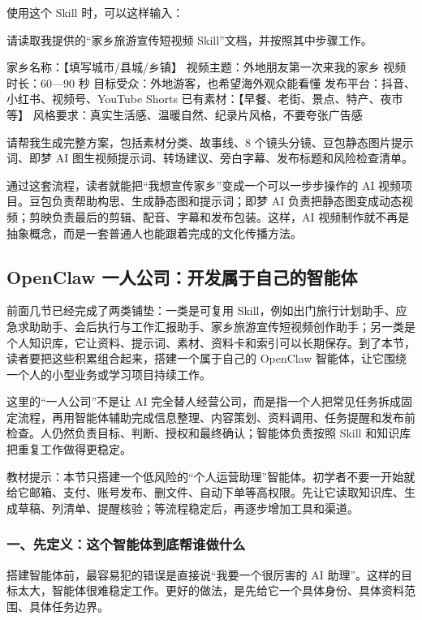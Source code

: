 使用这个 Skill 时，可以这样输入：

\begin{tcolorbox}[promptbox]
请读取我提供的“家乡旅游宣传短视频 Skill”文档，并按照其中步骤工作。

家乡名称：【填写城市/县城/乡镇】
视频主题：外地朋友第一次来我的家乡
视频时长：60—90 秒
目标受众：外地游客，也希望海外观众能看懂
发布平台：抖音、小红书、视频号、YouTube Shorts
已有素材：【早餐、老街、景点、特产、夜市等】
风格要求：真实生活感、温暖自然、纪录片风格，不要夸张广告感

请帮我生成完整方案，包括素材分类、故事线、8 个镜头分镜、豆包静态图片提示词、即梦 AI 图生视频提示词、转场建议、旁白字幕、发布标题和风险检查清单。
\end{tcolorbox}

通过这套流程，读者就能把“我想宣传家乡”变成一个可以一步步操作的 AI 视频项目。豆包负责帮助构思、生成静态图和提示词；即梦 AI 负责把静态图变成动态视频；剪映负责最后的剪辑、配音、字幕和发布包装。这样，AI 视频制作就不再是抽象概念，而是一套普通人也能跟着完成的文化传播方法。


\subsection{OpenClaw 一人公司：开发属于自己的智能体}

前面几节已经完成了两类铺垫：一类是可复用 Skill，例如出门旅行计划助手、应急求助助手、会后执行与工作汇报助手、家乡旅游宣传短视频创作助手；另一类是个人知识库，它让资料、提示词、素材、资料卡和索引可以长期保存。到了本节，读者要把这些积累组合起来，搭建一个属于自己的 OpenClaw 智能体，让它围绕一个人的小型业务或学习项目持续工作。

这里的“一人公司”不是让 AI 完全替人经营公司，而是指一个人把常见任务拆成固定流程，再用智能体辅助完成信息整理、内容策划、资料调用、任务提醒和发布前检查。人仍然负责目标、判断、授权和最终确认；智能体负责按照 Skill 和知识库把重复工作做得更稳定。

教材提示：本节只搭建一个低风险的“个人运营助理”智能体。初学者不要一开始就给它邮箱、支付、账号发布、删文件、自动下单等高权限。先让它读取知识库、生成草稿、列清单、提醒核验；等流程稳定后，再逐步增加工具和渠道。

\subsubsection*{一、先定义：这个智能体到底帮谁做什么}

搭建智能体前，最容易犯的错误是直接说“我要一个很厉害的 AI 助理”。这样的目标太大，智能体很难稳定工作。更好的做法，是先给它一个具体身份、具体资料范围、具体任务边界。

